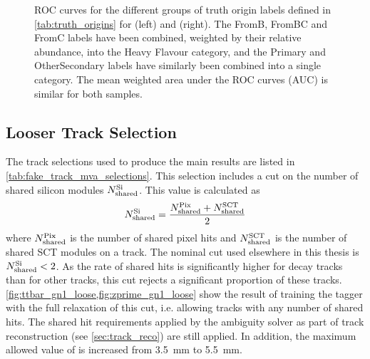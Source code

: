 \begin{figure}[!htbp]
\begin{subfigure}[b]{0.48\textwidth}
    \end{subfigure}
    \caption{ROC curves for the different groups of truth origin labels defined in \cref{tab:truth_origins} for \ttbarjets (left) and \Zprimejets (right).
             The FromB, FromBC and FromC labels have been combined, weighted by their relative abundance, into the Heavy Flavour category, and the Primary and OtherSecondary labels have similarly been combined into a single category.
             The mean weighted area under the ROC curves (AUC) is similar for both samples.}
    \label{fig:track_origin_roc}
\end{figure}



\subsection{Looser Track Selection}\label{sec:looser_track_selection}

The track selections used to produce the main results are listed in \cref{tab:fake_track_mva_selections}.
This selection includes a cut on the number of shared silicon modules $N^{\textnormal{Si}}_{\textnormal{shared}}$.
This value is calculated as 
%
\begin{equation}
    N^{\textnormal{Si}}_{\textnormal{shared}} = 
    \frac{N^{\textnormal{Pix}}_{\textnormal{shared}} + N^{\textnormal{SCT}}_{\textnormal{shared}}}{2}
\end{equation}
%
where $N^{\textnormal{Pix}}_{\textnormal{shared}}$ is the number of shared pixel hits and $N^{\textnormal{SCT}}_{\textnormal{shared}}$ is the number of shared SCT modules on a track.
The nominal cut used elsewhere in this thesis is $N^{\textnormal{Si}}_{\textnormal{shared}} < 2$.
As the rate of shared hits is significantly higher for \bhadron decay tracks than for other tracks, this cut rejects a significant proportion of these tracks.
\cref{fig:ttbar_gn1_loose,fig:zprime_gn1_loose} show the result of training the \GNN tagger with the full relaxation of this cut, i.e. allowing tracks with any number of shared hits.
The shared hit requirements applied by the ambiguity solver as part of track reconstruction (see \cref{sec:track_reco}) are still applied.
In addition, the maximum allowed value of \dzero is increased from \SI{3.5}{\milli\meter} to \SI{5.5}{\milli\meter}.

